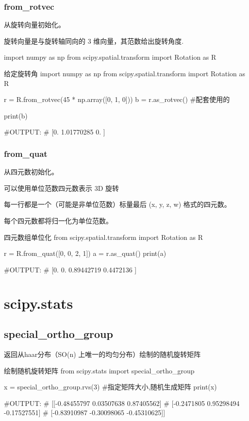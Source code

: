 \documentclass[11pt]{article}
\begin{document}
\subsubsection{from\_rotvec}
从旋转向量初始化。

旋转向量是与旋转轴同向的 3 维向量，其范数给出旋转角度.

import numpy as np
from scipy.spatial.transform import Rotation as R

\begin{Python}{给定旋转角}
import numpy as np
from scipy.spatial.transform import Rotation as R

r = R.from_rotvec(45 * np.array([0, 1, 0]))
b = r.as_rotvec()							#配套使用的

print(b)

#OUTPUT:
#       [0.         1.01770285 0.        ]
\end{Python}
\subsubsection{from\_quat}
从四元数初始化。

可以使用单位范数四元数表示 3D 旋转

每一行都是一个（可能是非单位范数）标量最后 (x, y, z, w) 格式的四元数。

每个四元数都将归一化为单位范数。

\begin{Python}{四元数组单位化}
from scipy.spatial.transform import Rotation as R

r = R.from_quat([0, 0, 2, 1])
a = r.as_quat()
print(a)

#OUTPUT:
#       [0.         0.         0.89442719 0.4472136 ]
\end{Python}
\section{scipy.stats}
\subsection{special\_ortho\_group}
返回从haar分布（SO(n) 上唯一的均匀分布）绘制的随机旋转矩阵
\begin{Python}{绘制随机旋转矩阵}
from scipy.stats import special_ortho_group

x = special_ortho_group.rvs(3)		#指定矩阵大小,随机生成矩阵
print(x)

#OUTPUT:
#		[[-0.48455797  0.03507638  0.87405562]
#		 [-0.2471805   0.95298494 -0.17527551]
#		 [-0.83910987 -0.30098065 -0.45310625]]
\end{Python}
\end{document}
